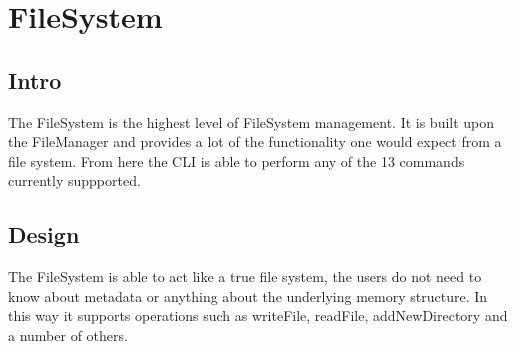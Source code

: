 \documentclass[12pt]{article}
\begin{document}
\section{FileSystem}
\subsection{Intro}
The FileSystem is the highest level of FileSystem management.  It is built upon the FileManager and provides a lot of the functionality one would expect from a file system.  From here the CLI is able to perform any of the 13 commands currently suppported.

\subsection{Design}
The FileSystem is able to act like a true file system, the users do not need to know about metadata or anything about the underlying memory structure.  In this way it supports operations such as writeFile, readFile, addNewDirectory and a number of others.
\end{document}
